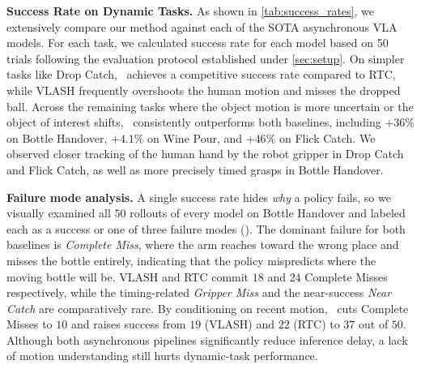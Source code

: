 \noindent\textbf{Success Rate on Dynamic Tasks.}
As shown in \cref{tab:success_rates}, we extensively compare our method against each of the SOTA asynchronous VLA models. For each task, we calculated success rate for each model based on 50 trials following the evaluation protocol established under \cref{sec:setup}. On simpler tasks like Drop Catch, \ours\ achieves a competitive success rate compared to RTC, while VLASH frequently overshoots the human motion and misses the dropped ball. Across the remaining tasks where the object motion is more uncertain or the object of interest shifts, \ours\ consistently outperforms both baselines, including $+36\%$ on Bottle Handover, $+4.1\%$ on Wine Pour, and $+46\%$ on Flick Catch. We observed closer tracking of the human hand by the robot gripper in Drop Catch and Flick Catch, as well as more precisely timed grasps in Bottle Handover.

\noindent\textbf{Failure mode analysis.}
A single success rate hides \emph{why} a policy fails, so we visually examined all
$50$ rollouts of every model on Bottle Handover and labeled each as a success or
one of three failure modes (). The dominant failure for both baselines is \emph{Complete Miss}, where the arm reaches toward the wrong place and misses the bottle entirely, indicating that the policy mispredicts where the moving bottle will be. VLASH and RTC commit $18$ and $24$ Complete Misses respectively, while the timing-related \emph{Gripper Miss} and the near-success \emph{Near Catch} are comparatively rare. By conditioning on recent motion, \ours\ cuts Complete Misses to $10$ and raises success from $19$ (VLASH) and $22$ (RTC) to $37$ out of $50$. Although both asynchronous pipelines significantly reduce inference delay, a lack of motion understanding still hurts dynamic-task performance.

